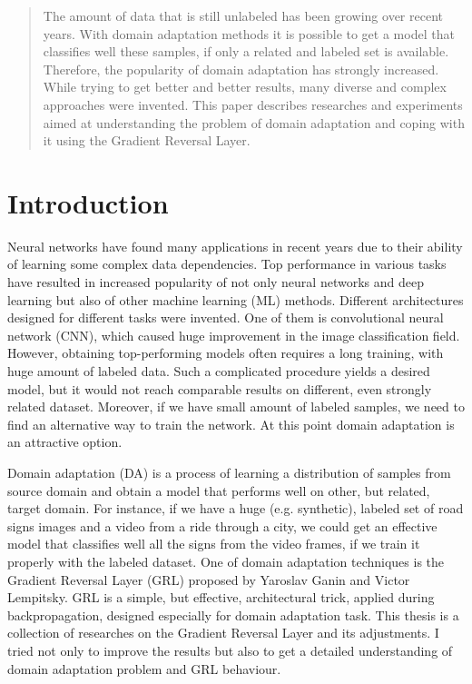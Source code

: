 \documentclass{article}
\begin{document}
\begin{abstract}
The amount of data that is still unlabeled has been growing over recent years. With domain adaptation methods it is possible to get a model that classifies well these samples, if only a related and labeled set is available. Therefore, the popularity of domain adaptation has strongly increased. While trying to get better and better results, many diverse and complex approaches were invented. This paper describes researches and experiments aimed at understanding the problem of domain adaptation and coping with it using the Gradient Reversal Layer.
\end{abstract}

\section{Introduction}
Neural networks have found many applications in recent years due to their ability of learning some complex data dependencies. Top performance in various tasks have resulted in increased popularity of not only neural networks and deep learning but also of other machine learning (ML) methods. Different architectures designed for different tasks were invented. One of them is convolutional neural network (CNN), which caused huge improvement in the image classification field. However, obtaining top-performing models often requires a long training, with huge amount of labeled data. Such a complicated procedure yields a desired model, but it would not reach comparable results on different, even strongly related dataset. Moreover, if we  have small amount of labeled samples, we need to find an alternative way to train the network. At this point domain adaptation is an attractive option.
\par
Domain adaptation (DA) is a process of learning a distribution of samples from source domain and obtain a model that performs well on other, but related, target domain. For instance, if we have a huge (e.g. synthetic), labeled set of road signs images and a video from a ride through a city, we could get an effective model that classifies well all the signs from the video frames, if we train it properly with the labeled dataset. One of domain adaptation techniques is the Gradient Reversal Layer (GRL) proposed by Yaroslav Ganin and Victor Lempitsky. GRL is a simple, but effective, architectural trick, applied during backpropagation, designed especially for domain adaptation task. This thesis is a collection of researches on the Gradient Reversal Layer and its adjustments. I tried not only to improve the results but also to get a detailed understanding of domain adaptation problem and GRL behaviour.
\end{document}
